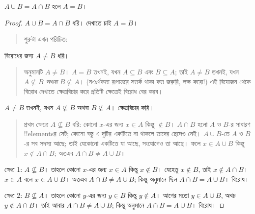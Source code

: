\documentclass[../../../include/open-logic-section]{subfiles}
\begin{document}
\begin{prop}
$A \cup B = A \cap B$ হলে $A = B$।
\end{prop}

\begin{proof}
  $A \cup B = A \cap B$ ধরি। দেখাতে চাই
  $A = B$।
  \begin{quote}
    শুরুটা এখন পরিচিত:
  \end{quote}
  বিরোধের জন্য $A \neq B$ ধরি।
  \begin{quote}
    অনুমানটি $A \neq B$। $A = B$ তখনই,
    যখন $A \subseteq B$ এবং $B \subseteq A$;
    তাই $A \neq B$ তখনই, যখন
    $A \nsubseteq B$ \emph{অথবা}
    $B \nsubseteq A$। (নঞর্থকতা রূপান্তরে
    সতর্ক থাকা কত জরুরি, লক্ষ করো!{})
    এই বিযোজন থেকে বিরোধ দেখাতে ক্ষেত্রবিচার
    করে প্রতিটি ক্ষেত্রেই বিরোধ বের করব।
  \end{quote}
  $A \neq B$ তখনই, যখন $A \nsubseteq B$
  অথবা $B \nsubseteq A$। ক্ষেত্রবিচার করি।
  \begin{quote}
    প্রথম ক্ষেত্রে $A \nsubseteq B$ ধরি:
    কোনো $x$-এর জন্য $x \in A$ কিন্তু
    $\notin B$। $A \cap B$ হলো $A$ ও $B$-র
    সাধারণ !!{element}sর সেট; কোনো বস্তু
    এ দুটির একটিতে না থাকলে তাদের ছেদেও নেই।
    $A \cup B$-তে $A$ ও $B$-র সব সদস্য আছে;
    তাই যেকোনো একটিতে যা আছে, সংযোগেও তা
    আছে। ফলে $x \in A \cup B$ কিন্তু
    $x \notin A \cap B$; অতএব
    $A \cap B \neq A \cup B$।
  \end{quote}

  ক্ষেত্র 1: $A \nsubseteq B$। তাহলে কোনো
  $x$-এর জন্য $x \in A$ কিন্তু $x \notin B$।
  যেহেতু $x \notin B$, তাই $x \notin A \cap B$।
  $x \in A$ বলে $x \in A \cup B$। অতএব
  $A \cap B \neq A \cup B$; কিন্তু অনুমানে
  ছিল $A \cap B = A \cup B$। বিরোধ।

  ক্ষেত্র 2: $B \nsubseteq A$। তাহলে কোনো
  $y$-এর জন্য $y \in B$ কিন্তু $y \notin A$।
  আগের মতো $y \in A \cup B$, অথচ
  $y \notin A \cap B$। তাই আবার
  $A \cap B \neq A \cup B$; কিন্তু অনুমানে
  $A \cap B = A \cup B$। বিরোধ।
\end{proof}
\end{document}
